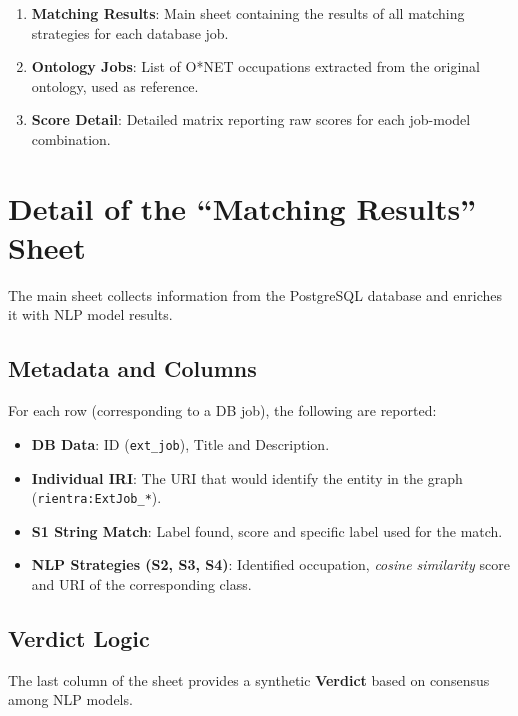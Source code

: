 \documentclass[12pt, a4paper]{report}
\begin{document}
\begin{enumerate}
  \item \textbf{Matching Results}: Main sheet containing the results of all matching strategies for each database job.
  \item \textbf{Ontology Jobs}: List of O*NET occupations extracted from the original ontology, used as reference.
  \item \textbf{Score Detail}: Detailed matrix reporting raw scores for each job-model combination.
\end{enumerate}

\section{Detail of the ``Matching Results'' Sheet}

The main sheet collects information from the PostgreSQL database and enriches it with NLP model results.

\subsection{Metadata and Columns}

For each row (corresponding to a DB job), the following are reported:
\begin{itemize}
    \item \textbf{DB Data}: ID (\texttt{ext\_job}), Title and Description.
    \item \textbf{Individual IRI}: The URI that would identify the entity in the graph (\texttt{rientra:ExtJob\_*}).
    \item \textbf{S1 String Match}: Label found, score and specific label used for the match.
    \item \textbf{NLP Strategies (S2, S3, S4)}: Identified occupation, \textit{cosine similarity} score and URI of the corresponding class.
\end{itemize}

\subsection{Verdict Logic}

The last column of the sheet provides a synthetic \textbf{Verdict} based on consensus among NLP models.
\end{document}
